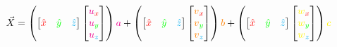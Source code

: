 \documentclass[preview]{standalone}
\begin{document}
$$\vec{X} =
\left(\begin{bmatrix}\textcolor{red}{\hat{x}}&\textcolor{green}{\hat{y}}&\textcolor{cyan}{\hat{z}}\end{bmatrix}\begin{bmatrix}\textcolor{magenta}{u}_{\textcolor{red}{x}}\\\textcolor{magenta}{u}_{\textcolor{green}{y}}\\\textcolor{magenta}{u}_{\textcolor{cyan}{z}}\end{bmatrix}\right)\textcolor{magenta}{a} +
\left(\begin{bmatrix}\textcolor{red}{\hat{x}}&\textcolor{green}{\hat{y}}&\textcolor{cyan}{\hat{z}}\end{bmatrix}\begin{bmatrix}\textcolor{orange}{v}_{\textcolor{red}{x}}\\\textcolor{orange}{v}_{\textcolor{green}{y}}\\\textcolor{orange}{v}_{\textcolor{cyan}{z}}\end{bmatrix}\right)\textcolor{orange}{b} +
\left(\begin{bmatrix}\textcolor{red}{\hat{x}}&\textcolor{green}{\hat{y}}&\textcolor{cyan}{\hat{z}}\end{bmatrix}\begin{bmatrix}\textcolor{yellow}{w}_{\textcolor{red}{x}}\\\textcolor{yellow}{w}_{\textcolor{green}{y}}\\\textcolor{yellow}{w}_{\textcolor{cyan}{z}}\end{bmatrix}\right)\textcolor{yellow}{c}$$
\end{document}
